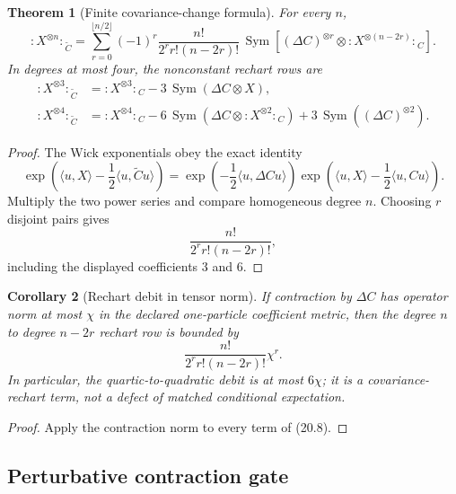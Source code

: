 \documentclass[11pt,oneside]{book}
\newtheorem{theorem}{Theorem}[chapter]
\newtheorem{corollary}[theorem]{Corollary}
\theoremstyle{definition}
\theoremstyle{remark}
\begin{document}
\begin{theorem}[Finite covariance-change formula]
\label{thm:e8v20-wick-rechart}
For every \(n\),
\[
\boxed{\quad
{:X^{\otimes n}:}_{\widetilde C}
=\sum_{r=0}^{\lfloor n/2\rfloor}
(-1)^r\frac{n!}{2^rr!(n-2r)!}\,
\operatorname{Sym}\!\left[
(\Delta C)^{\otimes r}
\otimes{:X^{\otimes(n-2r)}:}_C
\right].
\quad}                                                            \tag{20.8}
\]
In degrees at most four, the nonconstant rechart rows are
\[
\begin{aligned}
{:X^{\otimes3}:}_{\widetilde C}
 &={:X^{\otimes3}:}_C
   -3\,\operatorname{Sym}(\Delta C\otimes X),\\
{:X^{\otimes4}:}_{\widetilde C}
 &={:X^{\otimes4}:}_C
   -6\,\operatorname{Sym}
       (\Delta C\otimes{:X^{\otimes2}:}_C)
   +3\,\operatorname{Sym}((\Delta C)^{\otimes2}).                  \tag{20.9}
\end{aligned}
\]
\end{theorem}

\begin{proof}
The Wick exponentials obey the exact identity
\[
\exp\left(\langle u,X\rangle-\frac12\langle u,\widetilde Cu\rangle\right)
=
\exp\left(-\frac12\langle u,\Delta Cu\rangle\right)
\exp\left(\langle u,X\rangle-\frac12\langle u,Cu\rangle\right).
\]
Multiply the two power series and compare homogeneous degree \(n\).
Choosing \(r\) disjoint pairs gives
\[
\frac{n!}{2^rr!(n-2r)!},
\]
including the displayed coefficients \(3\) and \(6\).
\end{proof}

\begin{corollary}[Rechart debit in tensor norm]
\label{cor:e8v20-rechart-bound}
If contraction by \(\Delta C\) has operator norm at most \(\chi\) in
the declared one-particle coefficient metric, then the degree
\(n\) to degree \(n-2r\) rechart row is bounded by
\[
 \frac{n!}{2^rr!(n-2r)!}\chi^r.                   \tag{20.10}
\]
In particular, the quartic-to-quadratic debit is at most \(6\chi\);
it is a covariance-rechart term, not a defect of matched conditional
expectation.
\end{corollary}

\begin{proof}
Apply the contraction norm to every term of (20.8).
\end{proof}

\subsection{Perturbative contraction gate}
\end{document}

